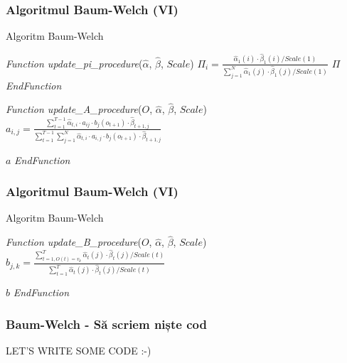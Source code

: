 \begin{frame}[fragile, t]
	\frametitle{Algoritmul Baum-Welch (VI)}	
	\begin{algorithm}[H]
		\scriptsize
      	\caption{Algoritm Baum-Welch}
      	\label{alg-baum-welch}
      	 
      	\begin{algorithmic}[1]
      		\STATE \emph{Function update\_pi\_procedure}($\hat{\alpha}$, $\hat{\beta}$, $Scale$)
					\STATE $\Pi_i = \frac{\hat{\alpha}_1(i) \cdot \hat{\beta}_1(i) / Scale(1)}
										{\sum_{j=1}^{N}{\hat{\alpha}_1(j) \cdot \hat{\beta}_1(j) / Scale(1)}}$
				\ENDFOR
				\RETURN $\Pi$
      		\STATE \emph{EndFunction}
			
			\vspace*{0.5em} 
      		\STATE \emph{Function update\_A\_procedure}($O$, $\hat{\alpha}$, $\hat{\beta}$, $Scale$)
					\STATE $a_{i,j} = \frac{\sum_{t=1}^{T-1}{\hat{\alpha}_{t,i}\cdot a_{ij} \cdot b_j(o_{t+1}) 
												\cdot \hat{\beta}_{t+1,j}}}
										{\sum_{t=1}^{T-1}\sum_{j=1}^{N}{\hat{\alpha}_{t,i}\cdot a_{i,j} 
										\cdot b_j(o_{t+1}) \cdot \hat{\beta}_{t+1,j}}}$
					\ENDFOR
				\ENDFOR
				
				\RETURN $a$
      		\STATE \emph{EndFunction}
		\end{algorithmic}
	\end{algorithm}  
\end{frame}


\begin{frame}[fragile]
	\frametitle{Algoritmul Baum-Welch (VI)}	
	\begin{algorithm}[H]
		\scriptsize
      	\caption{Algoritm Baum-Welch}
      	\label{alg-baum-welch}
      	 
      	\begin{algorithmic}[1]
      		\STATE \emph{Function update\_B\_procedure}($O$, $\hat{\alpha}$, $\hat{\beta}$, $Scale$)
					\STATE $b_{j,k} = \frac{\sum_{t=1,O(t)=v_k}^{T}
											{\hat{\alpha}_t(j) \cdot \hat{\beta}_t(j) / Scale(t)}}
										   {\sum_{t=1}^{T}
											{\hat{\alpha}_t(j) \cdot \hat{\beta}_t(j) / Scale(t)}}$
					\ENDFOR
				\ENDFOR
				
				\RETURN $b$
      		\STATE \emph{EndFunction}
		\end{algorithmic}
	\end{algorithm}  
\end{frame}


\begin{frame}
	\frametitle{Baum-Welch - Să scriem niște cod}
	\centering
	LET'S WRITE SOME CODE :-)
\end{frame}